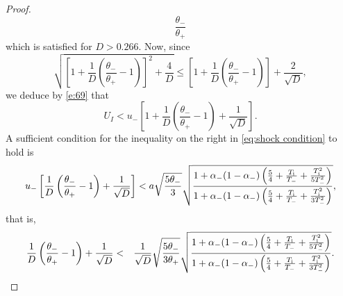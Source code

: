 \documentclass[10pt,a4paper]{article}
\numberwithin{equation}{section}
\newcommand{\Ti}{T_{\rm i}}
\begin{document}
\begin{proof}
$$\frac{\theta_-}{\theta_+}
$$%
which is satisfied for $D > 0.266.$ Now, since 
$$
\sqrt{\left[1 + \frac{1}{D}\left(\frac{\theta_-}{\theta_+} - 1\right)\right]^2 + \frac{4}{D}} 
\leq 
\left[1 + \frac{1}{D}\left(\frac{\theta_-}{\theta_+} - 1\right)\right] + \frac{2}{\sqrt{D}},
$$
we deduce by \eqref{e:69} that 
$$
U_I < u_-\left[1 + \frac{1}{D}\left(\frac{\theta_-}{\theta_+} - 1\right) + \frac{1}{\sqrt{D}}\right].
$$
A sufficient condition for the inequality on the right in \eqref{eq:shock condition} to hold is
$$
   u_- \left[\frac{1}{D}\left(\frac{\theta_-}{\theta_+} - 1\right) + \frac{1}{\sqrt{D}}\right]
< a\sqrt{\frac{5\theta_-}{3}}\sqrt{\frac{1 + \alpha_-(1 - \alpha_-)\left(\frac{5}{4} + \frac{\Ti}{T_-} + \frac{\Ti^2}{5T_-^2}\right)}{1 + \alpha_-(1 - \alpha_-)\left(\frac{5}{4} + \frac{\Ti}{T_-} + \frac{\Ti^2}{3T_-^2}\right)}},
$$
that is,
\begin{eqnarray}
  \frac{1}{D}\left(\frac{\theta_-}{\theta_+} - 1\right) + \frac{1}{\sqrt{D}}
&<& %
\frac{1}{\sqrt{D}}\sqrt{\frac{5\theta_-}{3\theta_+}}\sqrt{\frac{1 + \alpha_-(1 - \alpha_-)\left(\frac{5}{4} + \frac{\Ti}{T_-} + \frac{\Ti^2}{5T_-^2}\right)}{1 + \alpha_-(1 - \alpha_-)\left(\frac{5}{4} + \frac{\Ti}{T_-} + \frac{\Ti^2}{3T_-^2}\right)}}.
\label{e:simple_condition}

\end{eqnarray}
\end{proof}
\end{document}

